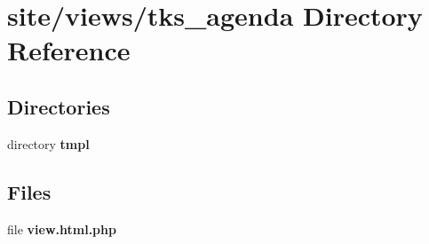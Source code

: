 \section{site/views/tks\+\_\+agenda Directory Reference}
\label{dir_66cc8860a26ee93c4bcca7c808610e78}
\subsection*{Directories}
\begin{DoxyCompactItemize}
\item 
directory \textbf{ tmpl}
\end{DoxyCompactItemize}
\subsection*{Files}
\begin{DoxyCompactItemize}
\item 
file \textbf{ view.\+html.\+php}
\end{DoxyCompactItemize}
